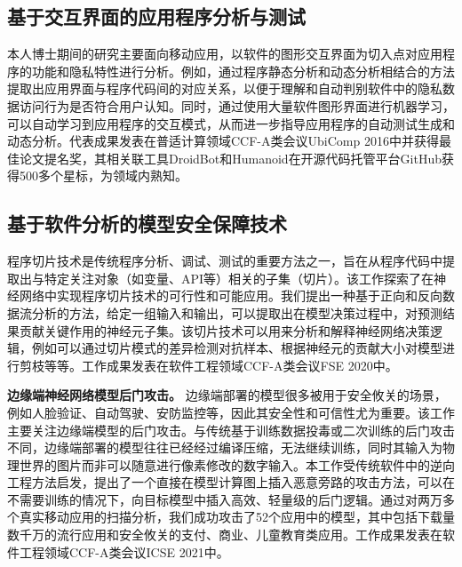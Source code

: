 \documentclass[12pt]{article}
\begin{document}

\subsection{基于交互界面的应用程序分析与测试}

本人博士期间的研究主要面向移动应用，以软件的图形交互界面为切入点对应用程序的功能和隐私特性进行分析。例如，通过程序静态分析和动态分析相结合的方法提取出应用界面与程序代码间的对应关系，以便于理解和自动判别软件中的隐私数据访问行为是否符合用户认知。同时，通过使用大量软件图形界面进行机器学习，可以自动学习到应用程序的交互模式，从而进一步指导应用程序的自动测试生成和动态分析。代表成果\cite{li2016peruim}发表在普适计算领域CCF-A类会议UbiComp 2016中并获得最佳论文提名奖，其相关联工具DroidBot\cite{li2017droidbot}和Humanoid\cite{li2019humanoid}在开源代码托管平台GitHub获得500多个星标\cite{droidbot:code}，为领域内熟知。
 

\subsection{基于软件分析的模型安全保障技术}

程序切片技术是传统程序分析、调试、测试的重要方法之一，旨在从程序代码中提取出与特定关注对象（如变量、API等）相关的子集（切片）。该工作探索了在神经网络中实现程序切片技术的可行性和可能应用。我们提出一种基于正向和反向数据流分析的方法，给定一组输入和输出，可以提取出在模型决策过程中，对预测结果贡献关键作用的神经元子集。该切片技术可以用来分析和解释神经网络决策逻辑，例如可以通过切片模式的差异检测对抗样本、根据神经元的贡献大小对模型进行剪枝等等。工作成果\cite{zhang2020dynamic}发表在软件工程领域CCF-A类会议FSE 2020中。

\textbf{边缘端神经网络模型后门攻击。}
边缘端部署的模型很多被用于安全攸关的场景，例如人脸验证、自动驾驶、安防监控等，因此其安全性和可信性尤为重要。该工作主要关注边缘端模型的后门攻击。与传统基于训练数据投毒或二次训练的后门攻击不同，边缘端部署的模型往往已经经过编译压缩，无法继续训练，同时其输入为物理世界的图片而非可以随意进行像素修改的数字输入。本工作受传统软件中的逆向工程方法启发，提出了一个直接在模型计算图上插入恶意旁路的攻击方法，可以在不需要训练的情况下，向目标模型中插入高效、轻量级的后门逻辑。通过对两万多个真实移动应用的扫描分析，我们成功攻击了52个应用中的模型，其中包括下载量数千万的流行应用和安全攸关的支付、商业、儿童教育类应用。工作成果\cite{li2021deeppayload}发表在软件工程领域CCF-A类会议ICSE 2021中。
\end{document}
